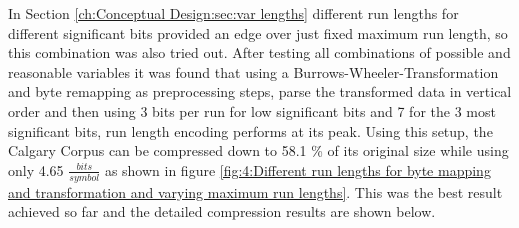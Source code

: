 \par{
In Section \ref{ch:Conceptual Design:sec:var lengths} different run lengths for different significant bits provided an edge over just fixed maximum run length, so this combination was also tried out. After testing all combinations of possible and reasonable variables it was found that using a Burrows-Wheeler-Transformation and byte remapping as preprocessing steps, parse the transformed data in vertical order and then using 3 bits per run for low significant bits and 7 for the 3 most significant bits, run length encoding performs at its peak. Using this setup, the Calgary Corpus can be compressed down to 58.1 \% of its original size while using only 4.65 $\frac{bits}{symbol}$ as shown in figure \ref{fig:4:Different run lengths for byte mapping and transformation and varying maximum run lengths}. This was the best result achieved so far and the detailed compression results are shown below.

}
